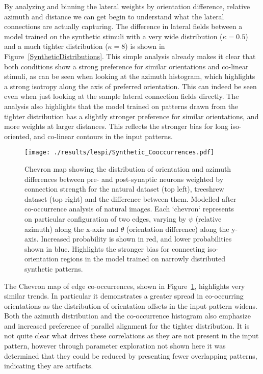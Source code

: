By analyzing and binning the lateral weights by orientation
difference, relative azimuth and distance we can get begin to
understand what the lateral connections are actually capturing. The
difference in lateral fields between a model trained on the synthetic
stimuli with a very wide distribution ($\kappa=0.5$) and a much
tighter distribution ($\kappa=8$) is shown in
Figure~\ref{SyntheticDistributions}. This simple analysis already
makes it clear that both conditions show a strong preference for
similar orientations and co-linear stimuli, as can be seen when
looking at the azimuth histogram, which highlights a strong isotropy
along the axis of preferred orientation. This can indeed be seen even
when just looking at the sample lateral connection fields
directly. The analysis also highlights that the model trained on
patterns drawn from the tighter distribution has a slightly stronger
preference for similar orientations, and more weights at larger
distances. This reflects the stronger bias for long iso-oriented, and
co-linear contours in the input patterns.

\begin{figure}
	\centering
        \texttt{[image: ./results/lespi/Synthetic\_Cooccurrences.pdf]}
	\caption[Chevron map showing the distribution of orientation and
      azimuth differences between pre- and post-synaptic
      neurons.]{Chevron map showing the distribution of orientation
      and azimuth differences between pre- and post-synaptic neurons
      weighted by connection strength for the natural dataset (top
      left), treeshrew dataset (top right) and the difference between
      them. Modelled after \cite{Perrinet2015} co-occurrence analysis
      of natural images. Each `chevron` represents on particular
      configuration of two edges, varying by $\psi$ (relative azimuth)
      along the x-axis and $\theta$ (orientation difference) along the
      y-axis. Increased probability is shown in red, and lower
      probabilities shown in blue. Highlights the stronger bias for
      connecting iso-orientation regions in the model trained on
      narrowly distributed synthetic patterns.}
	\label{SyntheticCooccurrence}
\end{figure}

The Chevron map of edge co-occurrences, shown in
Figure~\ref{SyntheticCooccurrence}, highlights very similar trends. In
particular it demonstrates a greater spread in co-occurring
orientations as the distribution of orientation offsets in the input
pattern widens. Both the azimuth distribution and the co-occurrence
histogram also emphasize and increased preference of parallel
alignment for the tighter distribution. It is not quite clear what
drives these correlations as they are not present in the input
pattern, however through parameter exploration not shown here it was
determined that they could be reduced by presenting fewer overlapping
patterns, indicating they are artifacts.

